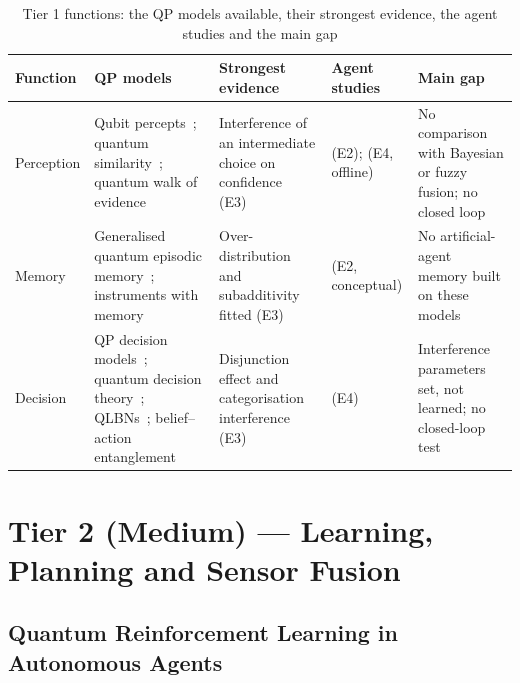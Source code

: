 \documentclass[pdflatex,sn-basic]{sn-jnl}
\begin{document}
\begin{table}[ht]
\centering
\caption{Tier 1 functions: the QP models available, their strongest evidence, the agent studies and the main gap}\label{tab:tier1}
\footnotesize
\begin{tabular}{@{}>{\raggedright\arraybackslash}p{0.110\dimexpr\textwidth-10\tabcolsep\relax}>{\raggedright\arraybackslash}p{0.260\dimexpr\textwidth-10\tabcolsep\relax}>{\raggedright\arraybackslash}p{0.230\dimexpr\textwidth-10\tabcolsep\relax}>{\raggedright\arraybackslash}p{0.190\dimexpr\textwidth-10\tabcolsep\relax}>{\raggedright\arraybackslash}p{0.210\dimexpr\textwidth-10\tabcolsep\relax}@{}}
\toprule
\textbf{Function} & \textbf{QP models} & \textbf{Strongest evidence} & \textbf{Agent studies} & \textbf{Main gap} \\
\midrule
Perception & Qubit percepts~\citep{Lanza2020,Lanza2021}; quantum similarity~\citep{Pothos2013b}; quantum walk of evidence~\citep{Kvam2015} & Interference of an intermediate choice on confidence (E3)~\citep{Kvam2015} & \citet{Lanza2020,Lanza2021} (E2); \citet{Chella2026} (E4, offline) & No comparison with Bayesian or fuzzy fusion; no closed loop \\
Memory & Generalised quantum episodic memory~\citep{Trueblood2017b}; instruments with memory~\citep{Busemeyer2025} & Over-distribution and subadditivity fitted (E3)~\citep{Trueblood2017b} & \citet{Kak2018} (E2, conceptual) & No artificial-agent memory built on these models \\
Decision & QP decision models~\citep{Pothos2009}; quantum decision theory~\citep{Yukalov2011}; QLBNs~\citep{Moreira2016}; belief--action entanglement~\citep{Wang2016} & Disjunction effect and categorisation interference (E3)~\citep{Pothos2009,Wang2016} & \citet{Song2022} (E4) & Interference parameters set, not learned; no closed-loop test \\
\bottomrule
\end{tabular}
\end{table}


\section{Tier 2 (Medium) --- Learning, Planning and Sensor Fusion}\label{sec:tier2}

\subsection{Quantum Reinforcement Learning in Autonomous Agents}\label{sec:qirl}
\end{document}
